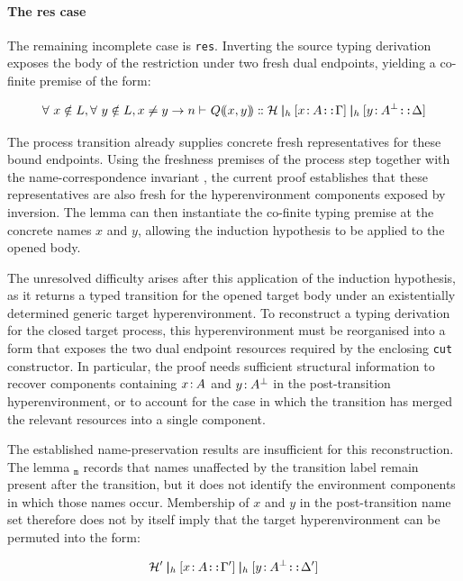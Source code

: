 \paragraph{The res case}
The remaining incomplete case is \texttt{res}. Inverting the source typing derivation exposes the body of the restriction under two fresh dual endpoints, yielding a co-finite premise of the form:
\begin{highlight}
\[
  \forall~x \notin L, \forall~y \notin L, x \neq y \to
    {{}n \vdash_{} Q\lparen\mkern-4mu\lparen x,y\rparen\mkern-4mu\rparen\mathrel{:\mspace{-1mu}:}\mathcal{H} \mathbin{\boldsymbol{|}}_h [x\colon\mspace{-2mu}A \texttt{::} \Gamma] \mathbin{\boldsymbol{|}}_h [y\colon\mspace{-2mu}A^{\bot} \texttt{::} \Delta]}
\]
\end{highlight}

The process transition already supplies concrete fresh representatives for these bound endpoints. Using the freshness premises of the process step together with the name-correspondence invariant , the current proof establishes that these representatives are also fresh for the hyperenvironment components exposed by inversion. The lemma  can then instantiate the co-finite typing premise at the concrete names $x$ and $y$, allowing the induction hypothesis to be applied to the opened body.

The unresolved difficulty arises after this application of the induction hypothesis, as it returns a typed transition for the opened target body under an existentially determined generic target hyperenvironment. To reconstruct a typing derivation for the closed target process, this hyperenvironment must be reorganised into a form that exposes the two dual endpoint resources required by the enclosing \texttt{cut} constructor. In particular, the proof needs sufficient structural information to recover components containing $x\colon\mspace{-2mu}A$ and $y\colon\mspace{-2mu}A^{\bot}$ in the post-transition hyperenvironment, or to account for the case in which the transition has merged the relevant resources into a single component.

The established name-preservation results are insufficient for this reconstruction. The lemma $_{\texttt{m}}$ records that names unaffected by the transition label remain present after the transition, but it does not identify the environment components in which those names occur. Membership of $x$ and $y$ in the post-transition name set therefore does not by itself imply that the target hyperenvironment can be permuted into the form:
\begin{highlight}  
  \[\mathcal{H}' \mathbin{\boldsymbol{|}}_h [x\colon\mspace{-2mu}A \texttt{::} \Gamma'] \mathbin{\boldsymbol{|}}_h [y\colon\mspace{-2mu}A^{\bot} \texttt{::} \Delta']\]
\end{highlight}

